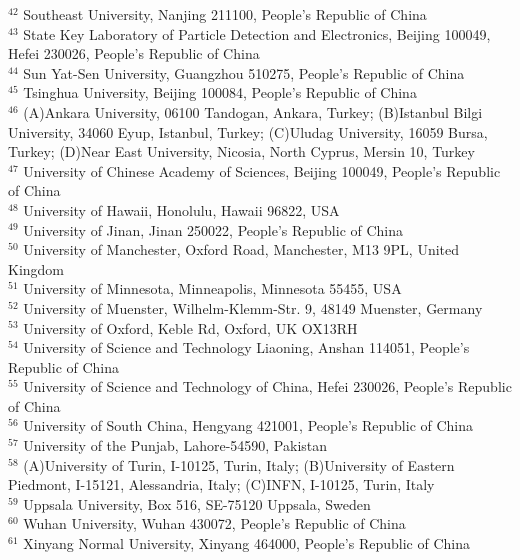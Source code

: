 \begin{small}
\begin{center}
{$^{42}$ Southeast University, Nanjing 211100, People's Republic of China\\
$^{43}$ State Key Laboratory of Particle Detection and Electronics, Beijing 100049, Hefei 230026, People's Republic of China\\
$^{44}$ Sun Yat-Sen University, Guangzhou 510275, People's Republic of China\\
$^{45}$ Tsinghua University, Beijing 100084, People's Republic of China\\
$^{46}$ (A)Ankara University, 06100 Tandogan, Ankara, Turkey; (B)Istanbul Bilgi University, 34060 Eyup, Istanbul, Turkey; (C)Uludag University, 16059 Bursa, Turkey; (D)Near East University, Nicosia, North Cyprus, Mersin 10, Turkey\\
$^{47}$ University of Chinese Academy of Sciences, Beijing 100049, People's Republic of China\\
$^{48}$ University of Hawaii, Honolulu, Hawaii 96822, USA\\
$^{49}$ University of Jinan, Jinan 250022, People's Republic of China\\
$^{50}$ University of Manchester, Oxford Road, Manchester, M13 9PL, United Kingdom\\
$^{51}$ University of Minnesota, Minneapolis, Minnesota 55455, USA\\
$^{52}$ University of Muenster, Wilhelm-Klemm-Str. 9, 48149 Muenster, Germany\\
$^{53}$ University of Oxford, Keble Rd, Oxford, UK OX13RH\\
$^{54}$ University of Science and Technology Liaoning, Anshan 114051, People's Republic of China\\
$^{55}$ University of Science and Technology of China, Hefei 230026, People's Republic of China\\
$^{56}$ University of South China, Hengyang 421001, People's Republic of China\\
$^{57}$ University of the Punjab, Lahore-54590, Pakistan\\
$^{58}$ (A)University of Turin, I-10125, Turin, Italy; (B)University of Eastern Piedmont, I-15121, Alessandria, Italy; (C)INFN, I-10125, Turin, Italy\\
$^{59}$ Uppsala University, Box 516, SE-75120 Uppsala, Sweden\\
$^{60}$ Wuhan University, Wuhan 430072, People's Republic of China\\
$^{61}$ Xinyang Normal University, Xinyang 464000, People's Republic of China\\
}
\end{center}
\end{small}
